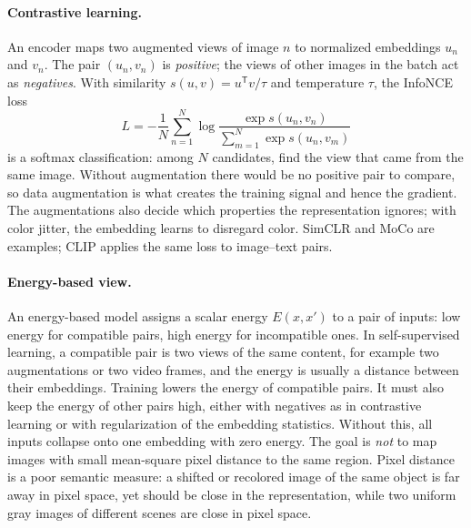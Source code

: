 \paragraph{Contrastive learning.}
An encoder maps two augmented views of image $n$ to normalized embeddings
$u_n$ and $v_n$. The pair $(u_n,v_n)$ is \emph{positive}; the views of other
images in the batch act as \emph{negatives}. With similarity
$s(u,v)=u^{\mathsf T}v/\tau$ and temperature $\tau$, the InfoNCE loss
\begin{equation}
  L = -\frac{1}{N}\sum_{n=1}^{N}\log
      \frac{\exp s(u_n,v_n)}{\sum_{m=1}^{N}\exp s(u_n,v_m)}
  \label{eq:infonce}
\end{equation}
\noindent
is a softmax classification: among $N$ candidates, find the view that came from
the same image. Without augmentation there would be no positive pair to compare,
so data augmentation is what creates the training signal and hence the
gradient. The augmentations also decide which properties the representation
ignores; with color jitter, the embedding learns to disregard color. SimCLR
and MoCo are examples; CLIP applies the same loss to image--text pairs.

\paragraph{Energy-based view.}
An energy-based model assigns a scalar energy $E(x,x')$ to a pair of inputs:
low energy for compatible pairs, high energy for incompatible ones. In
self-supervised learning, a compatible pair is two views of the same content,
for example two augmentations or two video frames, and the energy is usually a
distance between their embeddings. Training lowers the energy of compatible
pairs. It must also keep the energy of other pairs high, either with negatives
as in contrastive learning or with regularization of the embedding statistics.
Without this, all inputs collapse onto one embedding with zero energy. The goal
is \emph{not} to map images with small mean-square pixel distance to the same
region. Pixel distance is a poor semantic measure: a shifted or recolored image
of the same object is far away in pixel space, yet should be close in the
representation, while two uniform gray images of different scenes are close in
pixel space.
